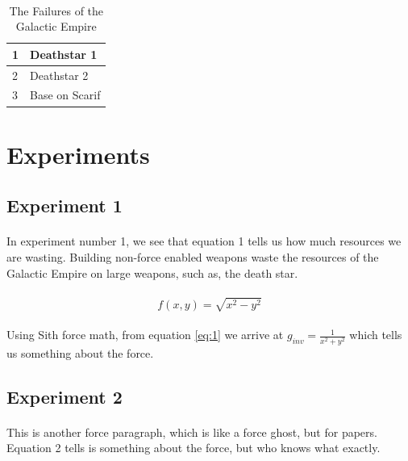 \documentclass[12pt]{article}
\begin{document}
\paragraph{}
\begin{table}
\centering
\label{1}
\caption{The Failures of the Galactic Empire}
\begin{tabular}{|l|l|} 
\hline
1 & Deathstar 1     \\ 
\hline
2 & Deathstar 2     \\ 
\hline
3 & Base on Scarif  \\
\hline
\end{tabular}
\end{table}


\section{Experiments}
    \subsection{Experiment 1}
    \paragraph{}
    In experiment number 1, we see that equation 1 tells us how much resources we are wasting. Building non-force enabled weapons waste the resources of the Galactic Empire on large weapons, such as, the death star.
    
	\paragraph{}
	\begin{equation}
	\label{eq:1}
	f(x,y)=\sqrt{x^2-y^2}
	\end{equation}
	
	
	\paragraph{}
	Using Sith force math, from equation \ref{eq:1} we arrive at
	\large $g_{inv}=\frac{1}{x^2 + y^2}$
    \normalsize which tells us something about the force.
    
    \subsection{Experiment 2}
    \paragraph{}
	This is another force paragraph, which is like a force ghost, but for papers. Equation 2 tells is something about the force, but who knows what exactly.    
    
\end{document}
